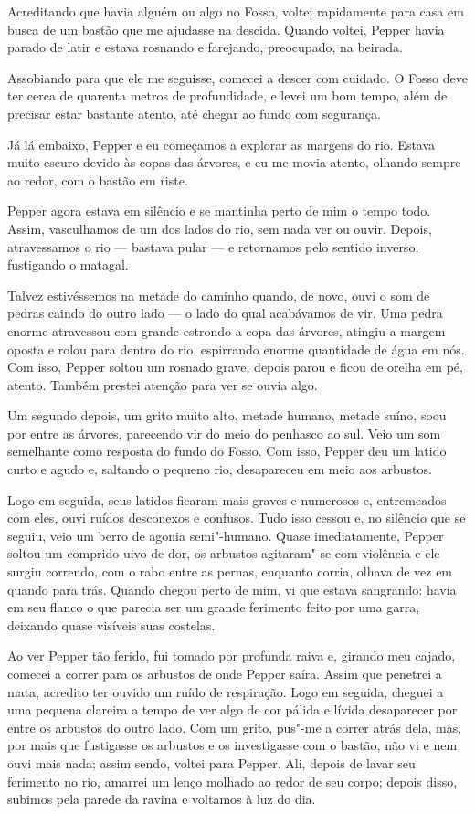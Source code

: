 Acreditando que havia alguém ou algo no Fosso, voltei rapidamente para casa em busca de um bastão que me ajudasse na
descida. Quando voltei, Pepper havia parado de latir e estava rosnando e farejando, preocupado, na beirada.

Assobiando para que ele me seguisse, comecei a descer com cuidado. O Fosso deve ter cerca de quarenta metros de
profundidade, e levei um bom tempo, além de precisar estar bastante atento, até chegar ao fundo com segurança.

Já lá embaixo, Pepper e eu começamos a explorar as margens do rio. Estava muito escuro devido às copas das árvores, e
eu me movia atento, olhando sempre ao redor, com o bastão em riste.

Pepper agora estava em silêncio e se mantinha perto de mim o tempo todo. Assim, vasculhamos de um dos lados do rio, sem
nada ver ou ouvir. Depois, atravessamos o rio --- bastava pular --- e retornamos pelo sentido inverso, fustigando o
matagal. 

Talvez estivéssemos na metade do caminho quando, de novo, ouvi o som de pedras caindo do outro lado --- o lado do qual
acabávamos de vir. Uma pedra enorme atravessou com grande estrondo a copa das árvores, atingiu a margem oposta e
rolou para dentro do rio, espirrando enorme quantidade de água em nós. Com isso, Pepper soltou um rosnado grave,
depois parou e ficou de orelha em pé, atento. Também prestei atenção para ver se ouvia algo.

Um segundo depois, um grito muito alto, metade humano, metade suíno, soou por entre as árvores, parecendo vir do
meio do penhasco ao sul. Veio um som semelhante como resposta do fundo do Fosso. Com isso, Pepper deu um latido curto e
agudo e, saltando o pequeno rio, desapareceu em meio aos arbustos.

Logo em seguida, seus latidos ficaram mais graves e numerosos e, entremeados com eles, ouvi ruídos desconexos e
confusos. Tudo isso cessou e, no silêncio que se seguiu, veio um berro de agonia semi"-humano. Quase imediatamente,
Pepper soltou um comprido uivo de dor, os arbustos agitaram"-se com violência e ele surgiu correndo, com o rabo entre as
pernas, enquanto corria, olhava de vez em quando para trás. Quando chegou perto de mim, vi que estava sangrando:
havia em seu flanco o que parecia ser um grande ferimento feito por uma garra, deixando quase visíveis suas
costelas.

Ao ver Pepper tão ferido, fui tomado por profunda raiva e, girando meu cajado, comecei a correr para os arbustos de
onde Pepper saíra. Assim que penetrei a mata, acredito ter ouvido um ruído de respiração. Logo em seguida, cheguei a uma
pequena clareira a tempo de ver algo de cor pálida e lívida desaparecer por entre os arbustos do outro lado. Com um
grito, pus"-me a correr atrás dela, mas, por mais que fustigasse os arbustos e os investigasse com o bastão, não vi e nem
ouvi mais nada; assim sendo, voltei para Pepper. Ali, depois de lavar seu ferimento no rio, amarrei um lenço molhado ao
redor de seu corpo; depois disso, subimos pela parede da ravina e voltamos à luz do dia.

